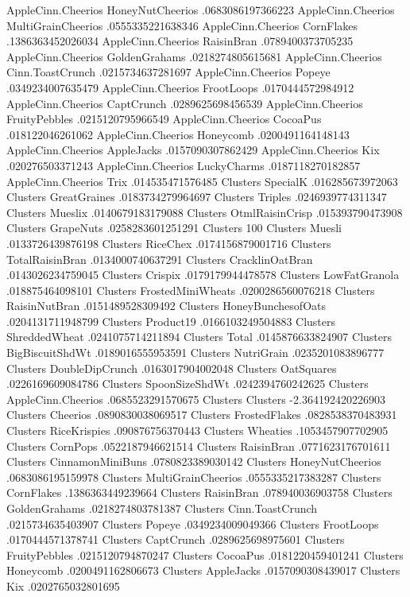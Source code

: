 AppleCinn.Cheerios	HoneyNutCheerios	.0683086197366223
AppleCinn.Cheerios	MultiGrainCheerios	.0555335221638346
AppleCinn.Cheerios	CornFlakes	.1386363452026034
AppleCinn.Cheerios	RaisinBran	.0789400373705235
AppleCinn.Cheerios	GoldenGrahams	.0218274805615681
AppleCinn.Cheerios	Cinn.ToastCrunch	.0215734637281697
AppleCinn.Cheerios	Popeye	.0349234007635479
AppleCinn.Cheerios	FrootLoops	.0170444572984912
AppleCinn.Cheerios	CaptCrunch	.0289625698456539
AppleCinn.Cheerios	FruityPebbles	.0215120795966549
AppleCinn.Cheerios	CocoaPus	.018122046261062
AppleCinn.Cheerios	Honeycomb	.0200491164148143
AppleCinn.Cheerios	AppleJacks	.0157090307862429
AppleCinn.Cheerios	Kix	.020276503371243
AppleCinn.Cheerios	LuckyCharms	.0187118270182857
AppleCinn.Cheerios	Trix	.014535471576485
Clusters	SpecialK	.016285673972063
Clusters	GreatGraines	.0183734279964697
Clusters	Triples	.0246939774311347
Clusters	Mueslix	.0140679183179088
Clusters	OtmlRaisinCrisp	.015393790473908
Clusters	GrapeNuts	.0258283601251291
Clusters	100%
Clusters	Muesli	.0133726439876198
Clusters	RiceChex	.0174156879001716
Clusters	TotalRaisinBran	.0134000740637291
Clusters	CracklinOatBran	.0143026234759045
Clusters	Crispix	.0179179944478578
Clusters	LowFatGranola	.018875464098101
Clusters	FrostedMiniWheats	.0200286560076218
Clusters	RaisinNutBran	.0151489528309492
Clusters	HoneyBunchesofOats	.0204131711948799
Clusters	Product19	.0166103249504883
Clusters	ShreddedWheat	.0241075714211894
Clusters	Total	.0145876633824907
Clusters	BigBiscuitShdWt	.0189016555953591
Clusters	NutriGrain	.0235201083896777
Clusters	DoubleDipCrunch	.0163017904002048
Clusters	OatSquares	.0226169609084786
Clusters	SpoonSizeShdWt	.0242394760242625
Clusters	AppleCinn.Cheerios	.0685523291570675
Clusters	Clusters	-2.364192420226903
Clusters	Cheerios	.0890830038069517
Clusters	FrostedFlakes	.0828538370483931
Clusters	RiceKrispies	.090876756370443
Clusters	Wheaties	.1053457907702905
Clusters	CornPops	.0522187946621514
Clusters	RaisinBran	.0771623176701611
Clusters	CinnamonMiniBuns	.0780823389030142
Clusters	HoneyNutCheerios	.0683086195159978
Clusters	MultiGrainCheerios	.0555335217383287
Clusters	CornFlakes	.1386363449239664
Clusters	RaisinBran	.078940036903758
Clusters	GoldenGrahams	.0218274803781387
Clusters	Cinn.ToastCrunch	.0215734635403907
Clusters	Popeye	.0349234009049366
Clusters	FrootLoops	.0170444571378741
Clusters	CaptCrunch	.0289625698975601
Clusters	FruityPebbles	.0215120794870247
Clusters	CocoaPus	.0181220459401241
Clusters	Honeycomb	.0200491162806673
Clusters	AppleJacks	.0157090308439017
Clusters	Kix	.0202765032801695
